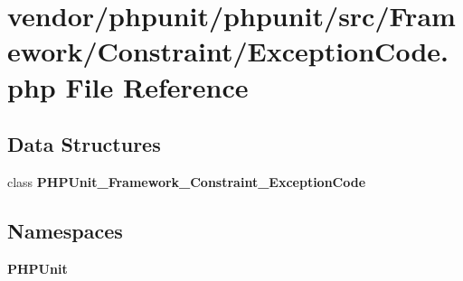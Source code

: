 \section{vendor/phpunit/phpunit/src/\+Framework/\+Constraint/\+Exception\+Code.php File Reference}
\label{_exception_code_8php}
\subsection*{Data Structures}
\begin{DoxyCompactItemize}
\item 
class {\bf P\+H\+P\+Unit\+\_\+\+Framework\+\_\+\+Constraint\+\_\+\+Exception\+Code}
\end{DoxyCompactItemize}
\subsection*{Namespaces}
\begin{DoxyCompactItemize}
\item 
 {\bf P\+H\+P\+Unit}
\end{DoxyCompactItemize}

